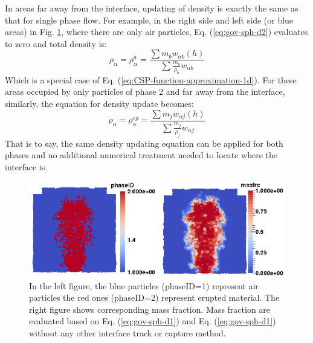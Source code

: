 \documentclass[journal abbreviation, manuscript]{copernicus}
\begin{document}
In areas far away from the interface, updating of density is exactly the same as that for single phase flow. For example, in the right side and left side (or blue areas) in Fig. \ref{fig:SPH-multiple-density}, where there are only air particles, Eq.  (\ref{eq:gov-sph-d2}) evaluates to zero and total density is:
\begin{equation}
\rho_{\alpha}=\rho_{\alpha}^a=\frac{\sum m_b w_{\alpha b} \left(h\right)}{\sum \frac{m_b}{\rho_b} w_{\alpha b}}
\end{equation}
Which is a special case of Eq. (\ref{eq:CSP-function-approximation-1d}). For these areas occupied by only particles of phase 2 and far away from the interface, similarly, the equation for density update becomes: 
\begin{equation}
\rho_{\alpha}=\rho_{\alpha}^{sg}=\frac{\sum m_j w_{\alpha j} \left(h\right)}{\sum \frac{m_j}{\rho_j} w_{\alpha j}}
\end{equation}
That is to say, the same density updating equation can be applied for both phases and no additional numerical treatment needed to locate where the interface is.

\begin{figure}
\includegraphics[width=12cm]{Interface.png}
\caption{In the left figure, the blue particles (phaseID=1) represent air particles the red ones (phaseID=2) represent erupted material. The right figure shows corresponding mass fraction. Mass fraction are evaluated based on Eq. (\ref{eq:gov-sph-d1}) and Eq. (\ref{eq:gov-sph-d1}) without any other interface track or capture method.}
\label{fig:SPH-multiple-density}
\end{figure}
\end{document}
